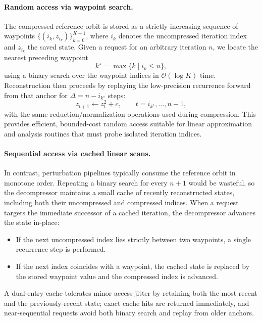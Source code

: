\paragraph{Random access via waypoint search.}
The compressed reference orbit is stored as a strictly increasing sequence of
waypoints
\(
\{(i_k, z_{i_k})\}_{k=0}^{K-1}
\),
where \(i_k\) denotes the uncompressed iteration index and \(z_{i_k}\) the saved
state.  Given a request for an arbitrary iteration \(n\), we locate the nearest
preceding waypoint
\begin{equation}
  k^\star = \max\{k \mid i_k \le n\},
\end{equation}
using a binary search over the waypoint indices in
\(\mathcal{O}(\log K)\) time.  Reconstruction then proceeds by replaying the
low-precision recurrence forward from that anchor for
\(\Delta = n - i_{k^\star}\) steps:
\begin{equation}
  z_{t+1} \leftarrow z_t^2 + c,
  \qquad t = i_{k^\star}, \dots, n-1,
\end{equation}
with the same reduction/normalization operations used during compression.  This
provides efficient, bounded-cost random access suitable for linear approximation
and analysis routines that must probe isolated iteration indices.

\paragraph{Sequential access via cached linear scans.}
In contrast, perturbation pipelines typically consume the reference orbit in
monotone order.  Repeating a binary search for every \(n+1\) would be wasteful,
so the decompressor maintains a small cache of recently reconstructed states,
including both their uncompressed and compressed indices.  When a request
targets the immediate successor of a cached iteration, the decompressor advances
the state in-place:
\begin{itemize}
  \item If the next uncompressed index lies strictly between two waypoints, a
        single recurrence step is performed.
  \item If the next index coincides with a waypoint, the cached state is replaced
        by the stored waypoint value and the compressed index is advanced.
\end{itemize}
A dual-entry cache tolerates minor access jitter by retaining both the most
recent and the previously-recent state; exact cache hits are returned
immediately, and near-sequential requests avoid both binary search and replay
from older anchors.


